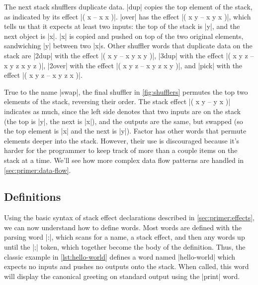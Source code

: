 The next stack shufflers duplicate data.  \factor|dup| copies the top element
of the stack, as indicated by its effect \factor|( x -- x x )|.  \factor|over|
has the effect \factor|( x y -- x y x )|, which tells us that it expects at
least two inputs: the top of the stack is \factor|y|, and the next object is
\factor|x|.  \factor|x| is copied and pushed on top of the two original
elements, sandwiching \factor|y| between two \factor|x|s.  Other shuffler words
that duplicate data on the stack are
%
\factor|2dup| with the effect \factor|( x y -- x y x y )|,
%
\factor|3dup| with the effect \factor|( x y z -- x y z x y z )|,
%
\factor|2over| with the effect \factor|( x y z -- x y z x y )|, and
%
\factor|pick| with the effect \factor|( x y z -- x y z x )|.

True to the name \factor|swap|, the final shuffler in \vref{fig:shufflers}
permutes the top two elements of the stack, reversing their order.  The stack
effect
%
\factor|( x y -- y x )|
%
indicates as much, since the left side denotes that two inputs are on the stack
(the top is \factor|y|, the next is \factor|x|), and the outputs are the same,
but swapped (so the top element is \factor|x| and the next is \factor|y|).
Factor has other words that permute elements deeper into the stack.  However,
their use is discouraged because it's harder for the programmer to keep track
of more than a couple items on the stack at a time.  We'll see how more complex
data flow patterns are handled in \cref{sec:primer:data-flow}.

\subsection{Definitions}



Using the basic syntax of stack effect declarations described in
\cref{sec:primer:effects}, we can now understand how to define words.  Most
words are defined with the parsing word \factor|:|, which scans for a name, a
stack effect, and then any words up until the \factor|;| token, which together
become the body of the definition.  Thus, the classic example in
\vref{lst:hello-world} defines a word named \factor|hello-world| which expects
no inputs and pushes no outputs onto the stack.  When called, this word will
display the canonical greeting on standard output using the \factor|print|
word.


